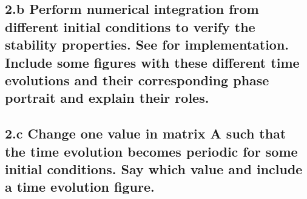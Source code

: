 \documentclass{cmc}
\begin{document}
\vspace{0.3\textheight}



\clearpage

\subsection*{2.b Perform numerical integration from different initial conditions
  to verify the stability properties. See 
  for implementation. Include some figures with these different time evolutions
  and their corresponding phase portrait and explain their roles.}


\clearpage

\subsection*{2.c Change one value in matrix A such that the time evolution
  becomes periodic for some initial conditions. Say which value and include a
  time evolution figure.}



\vspace{0.3\textheight}
\end{document}
